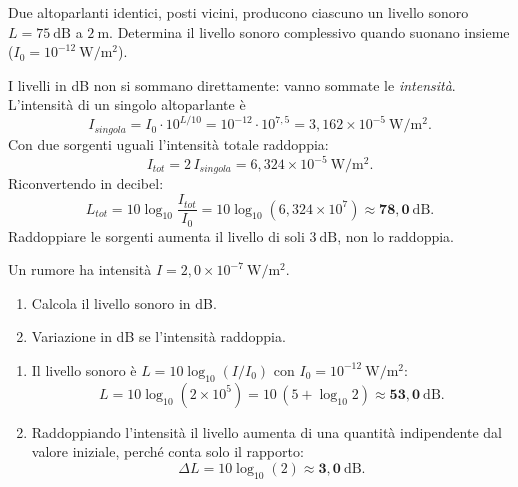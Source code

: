 \begin{question}[ID=5.4, subtitle={Due altoparlanti uguali — livello sonoro combinato}, tags={sorgenti multiple, intensità}, difficulty=difficile]
Due altoparlanti identici, posti vicini, producono ciascuno un livello sonoro $L = 75\ \mathrm{dB}$ a $2\ \mathrm{m}$. Determina il livello sonoro complessivo quando suonano insieme ($I_0 = 10^{-12}\ \mathrm{W/m^2}$).
\begin{solution}
I livelli in dB non si sommano direttamente: vanno sommate le \emph{intensità}. L'intensità di un singolo altoparlante è
\[
I_{singola} = I_0\cdot 10^{L/10} = 10^{-12}\cdot 10^{7{,}5} = 3{,}162\times10^{-5}\ \mathrm{W/m^2}.
\]
Con due sorgenti uguali l'intensità totale raddoppia:
\[
I_{tot} = 2\,I_{singola} = 6{,}324\times10^{-5}\ \mathrm{W/m^2}.
\]
Riconvertendo in decibel:
\[
L_{tot} = 10\log_{10}\!\frac{I_{tot}}{I_0} = 10\log_{10}(6{,}324\times10^{7}) \approx \mathbf{78{,}0\ \mathrm{dB}}.
\]
Raddoppiare le sorgenti aumenta il livello di soli $3\ \mathrm{dB}$, non lo raddoppia.
\end{solution}
\end{question}

\begin{question}[ID=5.5, subtitle={Livello sonoro da intensità e variazione per raddoppio}, tags={livello sonoro, scala logaritmica}, difficulty=media]
Un rumore ha intensità $I = 2{,}0\times10^{-7}\ \mathrm{W/m^2}$.
\begin{enumerate}
\item Calcola il livello sonoro in dB.
\item Variazione in dB se l'intensità raddoppia.
\end{enumerate}
\begin{solution}
\begin{enumerate}
\item Il livello sonoro è $L = 10\log_{10}(I/I_0)$ con $I_0 = 10^{-12}\ \mathrm{W/m^2}$:
\[
L = 10\log_{10}(2\times10^5) = 10\,(5 + \log_{10}2) \approx \mathbf{53{,}0\ \mathrm{dB}}.
\]
\item Raddoppiando l'intensità il livello aumenta di una quantità indipendente dal valore iniziale, perché conta solo il rapporto:
\[
\Delta L = 10\log_{10}(2) \approx \mathbf{3{,}0\ \mathrm{dB}}.
\]
\end{enumerate}
\end{solution}
\end{question}

